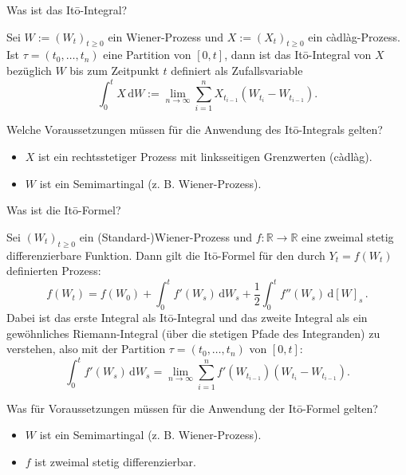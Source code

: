\begin{QandA}
    \item Was ist das Itō-Integral?
    \begin{answered}
        Sei $W:= (W_{t})_{t\geq 0}$ ein Wiener-Prozess und $X := (X_{t})_{t\geq 0}$ ein càdlàg-Prozess.
        Ist $\tau = (t_{0},\dots ,t_{n})$ eine Partition von $[0,t]$, dann ist das Itō-Integral von $X$ bezüglich $W$ bis zum Zeitpunkt $t$ definiert als Zufallsvariable
        \[
            \int_{0}^{t} X \, \mathrm{d}W := \lim_{n\to \infty } \sum_{i=1}^{n} X_{t_{i-1}}(W_{t_{i}}-W_{t_{i-1}}).
        \]
    \end{answered}

    \item Welche Voraussetzungen müssen für die Anwendung des Itō-Integrals gelten?
    \begin{answered}
        \begin{itemize}
            \item $X$ ist ein rechtsstetiger Prozess mit linksseitigen Grenzwerten (càdlàg).
            \item $W$ ist ein Semimartingal (z. B. Wiener-Prozess).
        \end{itemize}
    \end{answered}

    \item Was ist die Itō-Formel?
    \begin{answered}
        Sei $(W_{t})_{t\geq 0}$ ein (Standard-)Wiener-Prozess und $f\colon \mathbb{R} \to \mathbb{R}$ eine zweimal stetig differenzierbare Funktion.
        Dann gilt die Itō-Formel für den durch $Y_{t}=f(W_{t})$ definierten Prozess:
        \[
            f(W_{t})=f(W_{0})+\int_{0}^{t}f'(W_{s})\,{\mathrm{d}}W_{s}+{\frac{1}{2}}\int_{0}^{t}f''(W_{s})\,{\mathrm{d}}[W]_s\,.
        \]
        Dabei ist das erste Integral als Itō-Integral und das zweite Integral als ein gewöhnliches Riemann-Integral (über die stetigen Pfade des Integranden) zu verstehen, also mit der Partition $\tau = (t_{0},\dots ,t_{n})$ von $[0,t]$:
        \[
            \int_{0}^{t}f'(W_{s})\,{\mathrm{d}}W_{s} = \lim_{n\to \infty }\sum_{i=1}^{n}f'(W_{t_{i-1}})(W_{t_{i}}-W_{t_{i-1}}).
        \]
    \end{answered}

    \item Was für Voraussetzungen müssen für die Anwendung der Itō-Formel gelten?
    \begin{answered}
        \begin{itemize}
            \item $W$ ist ein Semimartingal (z. B. Wiener-Prozess).
            \item $f$ ist zweimal stetig differenzierbar.
        \end{itemize}
    \end{answered}


\end{QandA}
